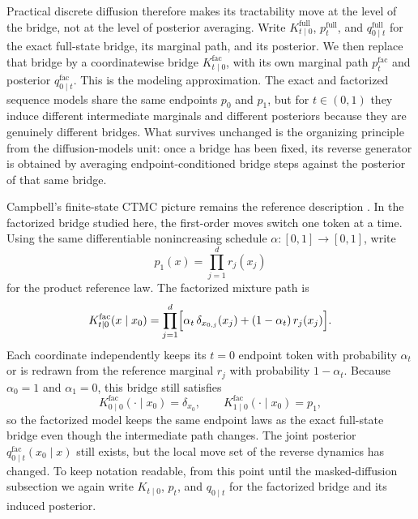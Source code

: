 \documentclass[11pt]{article}
\begin{document}
Practical discrete diffusion therefore makes its tractability move at the level of the bridge, not at the level of posterior averaging.
Write \(K^{\mathrm{full}}_{t\mid 0}\), \(p_t^{\mathrm{full}}\), and \(q^{\mathrm{full}}_{0\mid t}\) for the exact full-state bridge, its marginal path, and its posterior.
We then replace that bridge by a coordinatewise bridge \(K^{\mathrm{fac}}_{t\mid 0}\), with its own marginal path \(p_t^{\mathrm{fac}}\) and posterior \(q^{\mathrm{fac}}_{0\mid t}\).
This is the modeling approximation.
The exact and factorized sequence models share the same endpoints \(p_0\) and \(p_1\), but for \(t\in(0,1)\) they induce different intermediate marginals and different posteriors because they are genuinely different bridges.
What survives unchanged is the organizing principle from the diffusion-models unit:
once a bridge has been fixed, its reverse generator is obtained by averaging endpoint-conditioned bridge steps against the posterior of that same bridge.

Campbell's finite-state CTMC picture remains the reference description \citep[\S3.1 and \S4.2]{campbell2022continuous}.
In the factorized bridge studied here, the first-order moves switch one token at a time.
Using the same differentiable nonincreasing schedule \(\alpha:[0,1]\to[0,1]\), write
\[
  p_1(x)=\prod_{j=1}^d r_j(x_j)
\]
for the product reference law.
The factorized mixture path is
\begin{equation}
  K^{\mathrm{fac}}_{t\mid 0}(x\mid x_0)
  =
  \prod_{j=1}^d
  \Bigl[
    \alpha_t\,\delta_{x_{0,j}}(x_j)
    +
    (1-\alpha_t)\,r_j(x_j)
  \Bigr].
  \label{eq:factorized-mixture-path}
\end{equation}
Each coordinate independently keeps its \(t=0\) endpoint token with probability \(\alpha_t\) or is redrawn from the reference marginal \(r_j\) with probability \(1-\alpha_t\).
Because \(\alpha_0=1\) and \(\alpha_1=0\), this bridge still satisfies
\[
  K^{\mathrm{fac}}_{0\mid 0}(\cdot\mid x_0)=\delta_{x_0},
  \qquad
  K^{\mathrm{fac}}_{1\mid 0}(\cdot\mid x_0)=p_1,
\]
so the factorized model keeps the same endpoint laws as the exact full-state bridge even though the intermediate path changes.
The joint posterior \(q^{\mathrm{fac}}_{0\mid t}(x_0\mid x)\) still exists, but the local move set of the reverse dynamics has changed.
To keep notation readable, from this point until the masked-diffusion subsection we again write \(K_{t\mid 0}\), \(p_t\), and \(q_{0\mid t}\) for the factorized bridge and its induced posterior.
\end{document}
